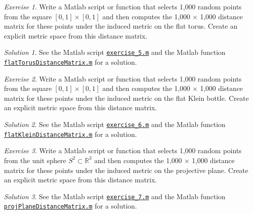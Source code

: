 \documentclass[amscd, amssymb, verbatim]{amsart}[12pt]
\theoremstyle{remark}
\theoremstyle{remark}
\newtheorem{exerciseSol}{Exercise}
\theoremstyle{remark}
\newtheorem*{solution}{Solution}
\newcommand{\R}{\mathbb{R}}
\begin{document}
\begin{exerciseSol}
Write a Matlab script or function that selects 1,000 random points from the square $[0, 1] \times [0, 1]$ and then computes the 1,000 $\times$ 1,000 distance matrix for these points under the induced metric on the flat torus. Create an explicit metric space from this distance matrix.
\end{exerciseSol}

\begin{solution}
See the Matlab script \href{https://github.com/appliedtopology/javaplex/tree/master/src/matlab/for_distribution/tutorial_solutions/exercise_5.m}{\texttt{exercise\_5.m}} and the Matlab function \href{https://github.com/appliedtopology/javaplex/tree/master/src/matlab/for_distribution/tutorial_solutions/flatTorusDistanceMatrix.m}{\texttt{flatTorusDistanceMatrix.m}} for a solution.
\end{solution}

\begin{exerciseSol}
Write a Matlab script or function that selects 1,000 random points from the square $[0, 1] \times [0, 1]$ and then computes the 1,000 $\times$ 1,000 distance matrix for these points under the induced metric on the flat Klein bottle. Create an explicit metric space from this distance matrix.
\end{exerciseSol}

\begin{solution}
See the Matlab script \href{https://github.com/appliedtopology/javaplex/tree/master/src/matlab/for_distribution/tutorial_solutions/exercise_6.m}{\texttt{exercise\_6.m}} and the Matlab function \href{https://github.com/appliedtopology/javaplex/tree/master/src/matlab/for_distribution/tutorial_solutions/flatKleinDistanceMatrix.m}{\texttt{flatKleinDistanceMatrix.m}} for a solution.
\end{solution}

\begin{exerciseSol}
Write a Matlab script or function that selects 1,000 random points from the unit sphere $S^2 \subset \R^3$ and then computes the 1,000 $\times$ 1,000 distance matrix for these points under the induced metric on the projective plane. Create an explicit metric space from this distance matrix. 
\end{exerciseSol}

\begin{solution}
See the Matlab script \href{https://github.com/appliedtopology/javaplex/tree/master/src/matlab/for_distribution/tutorial_solutions/exercise_7.m}{\texttt{exercise\_7.m}} and the Matlab function \href{https://github.com/appliedtopology/javaplex/tree/master/src/matlab/for_distribution/tutorial_solutions/projPlaneDistanceMatrix.m}{\texttt{projPlaneDistanceMatrix.m}} for a solution.
\end{solution}
\end{document}
